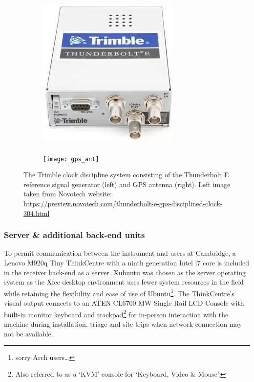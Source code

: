 \begin{figure}
    \centering
    \centering
    \begin{subfigure}{.3\textwidth}
        \centering
        \includegraphics[width=\linewidth]{trimble}
    \end{subfigure}
    \hspace{.15\textwidth}
    \begin{subfigure}{.33\textwidth}
    \centering
        \texttt{[image: gps\_ant]}
    \end{subfigure}
    \caption{The Trimble clock discipline system consisting of the Thunderbolt E reference signal generator (left) and GPS antenna (right). Left image taken from Novotech website: \url{https://preview.novotech.com/thunderbolt-e-gps-disciplined-clock-304.html}}
    \label{fig:gps}
\end{figure}


\subsubsection{Server \& additional back-end units}
To permit communication between the instrument and users at Cambridge, a Lenovo M920q Tiny ThinkCentre with a ninth generation Intel i7 core is included in the receiver back-end as a server. Xubuntu was chosen as the server operating system as the Xfce desktop environment uses fewer system resources in the field while retaining the flexibility and ease of use of Ubuntu\footnote{sorry Arch users…}. The ThinkCentre’s visual output connects to an ATEN CL6700 MW Single Rail LCD Console with built-in monitor keyboard and trackpad\footnote{Also referred to as a ‘KVM’ console for ‘Keyboard, Video \& Mouse’.} for in-person interaction with the machine during installation, triage and site trips when network connection may not be available.

